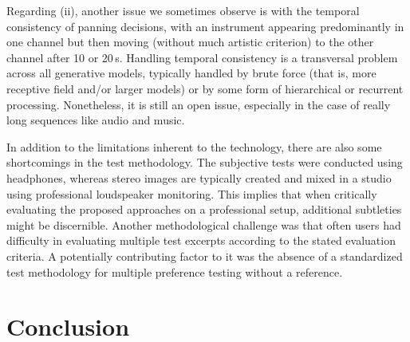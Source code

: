 \documentclass{article}
\newcommand{\dani}[1]{{\color{green}[DANI: #1]}}
\newcommand{\dani}[1]{}
\begin{document}
Regarding (ii), another issue we sometimes observe is with the temporal consistency of panning decisions, with an instrument appearing predominantly in one channel but then moving (without much artistic criterion) to the other channel after 10 or 20\,s. Handling temporal consistency is a transversal problem across all generative models, typically handled by brute force (that is, more receptive field and/or larger models) or by some form of hierarchical or recurrent processing. Nonetheless, it is still an open issue, especially in the case of really long sequences like audio and music. 

In addition to the limitations inherent to the technology, there are also some shortcomings in the test methodology. The subjective tests were conducted using headphones, whereas stereo images are typically created and mixed in a studio using professional loudspeaker monitoring. This implies that when critically evaluating the proposed approaches on a professional setup, additional subtleties might be discernible.
Another methodological challenge was that often users had difficulty in evaluating multiple test excerpts according to the stated evaluation criteria. A potentially contributing factor to it was the absence of a standardized test methodology for multiple preference testing without a reference.

\section{Conclusion}
\end{document}
